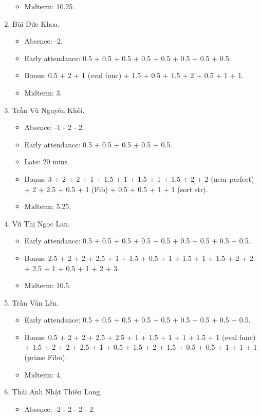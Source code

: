 \documentclass{article}
\begin{document}
\begin{enumerate}
\begin{itemize}
        \item Midterm: 10.25.
	\end{itemize}
	\item {\sc Bùi Đức Khoa.}
	\begin{itemize}
		\item Absence: -2.
		\item Early attendance: 0.5 + 0.5 + 0.5 + 0.5 + 0.5 + 0.5 + 0.5 + 0.5.
		\item Bonus: 0.5 + 2 + 1 (eval func) + 1.5 + 0.5 + 1.5 + 2 + 0.5 + 1 + 1.
        \item Midterm: 3.
	\end{itemize}
	\item {\sc Trần Vũ Nguyên Khôi.}
	\begin{itemize}
        \item Absence: -1 - 2 - 2.
		\item Early attendance: 0.5 + 0.5 + 0.5 + 0.5 + 0.5.
		\item Late: 20 mins.
		\item Bonus: 3 + 2 + 2 + 1 + 1.5 + 1 + 1.5 + 1 + 1.5 + 2 + 2 (near perfect) + 2 + 2.5 + 0.5 + 1 (Fib) + 0.5 + 0.5 + 1 + 1 (sort str).
        \item Midterm: 5.25.
	\end{itemize}
	\item {\sc Vũ Thị Ngọc Lan.}
	\begin{itemize}
		\item Early attendance: 0.5 + 0.5 + 0.5 + 0.5 + 0.5 + 0.5 + 0.5 + 0.5 + 0.5.
		\item Bonus: 2.5 + 2 + 2 + 2.5 + 1 + 1.5 + 0.5 + 1 + 1.5 + 1 + 1.5 + 2 + 2 + 2.5 + 1 + 0.5 + 1 + 2 + 3.
        \item Midterm: 10.5.
	\end{itemize}
	\item {\sc Trần Văn Lên.}
	\begin{itemize}
		\item Early attendance: 0.5 + 0.5 + 0.5 + 0.5 + 0.5 + 0.5 + 0.5 + 0.5 + 0.5.
		\item Bonus: 0.5 + 2 + 2 + 2.5 + 2.5 + 1 + 1.5 + 1 + 1 + 1.5 + 1 (eval func) + 1.5 + 2 + 2 + 2.5 + 1 + 0.5 + 1.5 + 2 + 1.5 + 0.5 + 0.5 + 1 + 1 + 1 (prime Fibo).
        \item Midterm: 4.
	\end{itemize}
	\item {\sc Thái Anh Nhật Thiên Long.}
	\begin{itemize}
		\item Absence: -2 - 2 - 2 - 2.

\end{itemize}
\end{enumerate}
\end{document}
